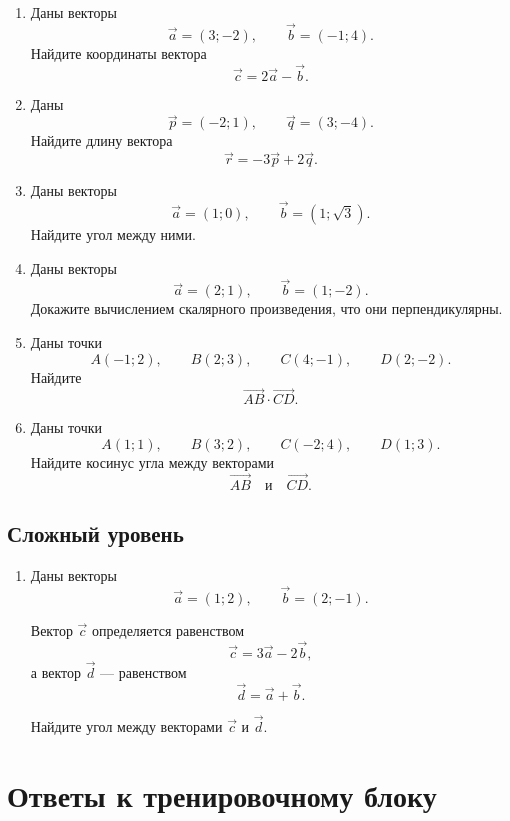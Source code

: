 \documentclass[a4paper,12pt]{article}
\newcommand{\vect}[1]{\overrightarrow{#1}}
\newcommand{\dotprod}{\mathbin{\cdot}}
\begin{document}
\begin{enumerate}[label=\textbf{\arabic*.},start=4]

\item
Даны векторы
\[
\vec a=(3;-2),
\qquad
\vec b=(-1;4).
\]
Найдите координаты вектора
\[
\vec c=2\vec a-\vec b.
\]

\item
Даны
\[
\vec p=(-2;1),
\qquad
\vec q=(3;-4).
\]
Найдите длину вектора
\[
\vec r=-3\vec p+2\vec q.
\]

\item
Даны векторы
\[
\vec a=(1;0),
\qquad
\vec b=(1;\sqrt3).
\]
Найдите угол между ними.

\item
Даны векторы
\[
\vec a=(2;1),
\qquad
\vec b=(1;-2).
\]
Докажите вычислением скалярного произведения, что они перпендикулярны.

\item
Даны точки
\[
A(-1;2),
\qquad
B(2;3),
\qquad
C(4;-1),
\qquad
D(2;-2).
\]
Найдите
\[
\vect{AB}\dotprod\vect{CD}.
\]

\item
Даны точки
\[
A(1;1),
\qquad
B(3;2),
\qquad
C(-2;4),
\qquad
D(1;3).
\]
Найдите косинус угла между векторами
\[
\vect{AB}
\quad\text{и}\quad
\vect{CD}.
\]

\end{enumerate}

\subsection*{Сложный уровень}

\begin{enumerate}[label=\textbf{\arabic*.},start=10]

\item
Даны векторы
\[
\vec a=(1;2),
\qquad
\vec b=(2;-1).
\]

Вектор \(\vec c\) определяется равенством
\[
\vec c=3\vec a-2\vec b,
\]
а вектор \(\vec d\) --- равенством
\[
\vec d=\vec a+\vec b.
\]

Найдите угол между векторами \(\vec c\) и \(\vec d\).

\end{enumerate}

\clearpage


\section*{\color{darkaccent}Ответы к тренировочному блоку}
\end{document}

